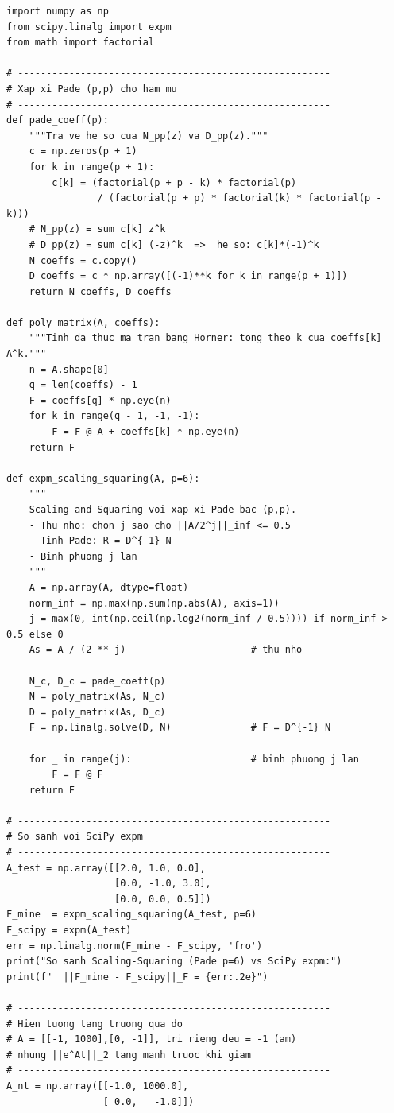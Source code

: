 \documentclass[12pt,a4paper]{report}
\begin{document}
\begin{lstlisting}[style=python, caption={Hàm mũ ma trận: Scaling and Squaring + Padé, và hiện tượng transient growth}]
import numpy as np
from scipy.linalg import expm
from math import factorial

# -------------------------------------------------------
# Xap xi Pade (p,p) cho ham mu
# -------------------------------------------------------
def pade_coeff(p):
    """Tra ve he so cua N_pp(z) va D_pp(z)."""
    c = np.zeros(p + 1)
    for k in range(p + 1):
        c[k] = (factorial(p + p - k) * factorial(p)
                / (factorial(p + p) * factorial(k) * factorial(p - k)))
    # N_pp(z) = sum c[k] z^k
    # D_pp(z) = sum c[k] (-z)^k  =>  he so: c[k]*(-1)^k
    N_coeffs = c.copy()
    D_coeffs = c * np.array([(-1)**k for k in range(p + 1)])
    return N_coeffs, D_coeffs

def poly_matrix(A, coeffs):
    """Tinh da thuc ma tran bang Horner: tong theo k cua coeffs[k] A^k."""
    n = A.shape[0]
    q = len(coeffs) - 1
    F = coeffs[q] * np.eye(n)
    for k in range(q - 1, -1, -1):
        F = F @ A + coeffs[k] * np.eye(n)
    return F

def expm_scaling_squaring(A, p=6):
    """
    Scaling and Squaring voi xap xi Pade bac (p,p).
    - Thu nho: chon j sao cho ||A/2^j||_inf <= 0.5
    - Tinh Pade: R = D^{-1} N
    - Binh phuong j lan
    """
    A = np.array(A, dtype=float)
    norm_inf = np.max(np.sum(np.abs(A), axis=1))
    j = max(0, int(np.ceil(np.log2(norm_inf / 0.5)))) if norm_inf > 0.5 else 0
    As = A / (2 ** j)                      # thu nho

    N_c, D_c = pade_coeff(p)
    N = poly_matrix(As, N_c)
    D = poly_matrix(As, D_c)
    F = np.linalg.solve(D, N)              # F = D^{-1} N

    for _ in range(j):                     # binh phuong j lan
        F = F @ F
    return F

# -------------------------------------------------------
# So sanh voi SciPy expm
# -------------------------------------------------------
A_test = np.array([[2.0, 1.0, 0.0],
                   [0.0, -1.0, 3.0],
                   [0.0, 0.0, 0.5]])
F_mine  = expm_scaling_squaring(A_test, p=6)
F_scipy = expm(A_test)
err = np.linalg.norm(F_mine - F_scipy, 'fro')
print("So sanh Scaling-Squaring (Pade p=6) vs SciPy expm:")
print(f"  ||F_mine - F_scipy||_F = {err:.2e}")

# -------------------------------------------------------
# Hien tuong tang truong qua do
# A = [[-1, 1000],[0, -1]], tri rieng deu = -1 (am)
# nhung ||e^At||_2 tang manh truoc khi giam
# -------------------------------------------------------
A_nt = np.array([[-1.0, 1000.0],
                 [ 0.0,   -1.0]])


\end{lstlisting}
\end{document}
